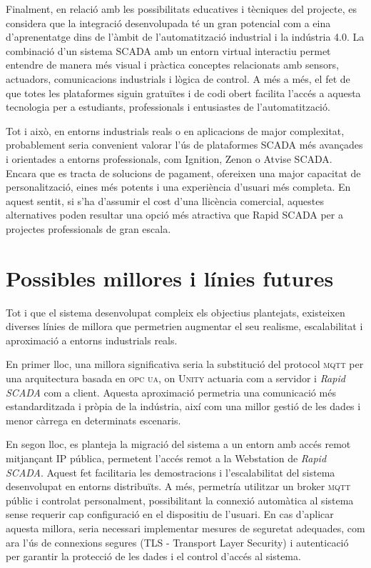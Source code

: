 \documentclass[a4paper,11pt,DIV=13,headings=normal,abstract=true,twoside=semi]{article}
\newcommand{\acro}[1]{\textsc{#1}}
\begin{document}
Finalment, en relació amb les possibilitats educatives i tècniques del projecte, es considera que la integració desenvolupada té un gran potencial com a eina d'aprenentatge dins de l'àmbit de l'automatització industrial i la indústria 4.0. La combinació d'un sistema \acro{SCADA} amb un entorn virtual interactiu permet entendre de manera més visual i pràctica conceptes relacionats amb sensors, actuadors, comunicacions industrials i lògica de control. A més a més, el fet de que totes les plataformes siguin gratuïtes i de codi obert facilita l'accés a aquesta tecnologia per a estudiants, professionals i entusiastes de l'automatització.

Tot i això, en entorns industrials reals o en aplicacions de major complexitat, probablement seria convenient valorar l'ús de plataformes \acro{SCADA} més avançades i orientades a entorns professionals, com Ignition, Zenon o Atvise SCADA. Encara que es tracta de solucions de pagament, ofereixen una major capacitat de personalització, eines més potents i una experiència d'usuari més completa. En aquest sentit, si s'ha d'assumir el cost d'una llicència comercial, aquestes alternatives poden resultar una opció més atractiva que Rapid SCADA per a projectes professionals de gran escala.

\newpage
\section{Possibles millores i línies futures}
\label{sec:future_work}
Tot i que el sistema desenvolupat compleix els objectius plantejats, existeixen diverses línies de millora que permetrien augmentar el seu realisme, escalabilitat i aproximació a entorns industrials reals.

En primer lloc, una millora significativa seria la substitució del protocol \acro{mqtt} per una arquitectura basada en \acro{opc ua}, on \acro{\acro{Unity}} actuaria com a servidor i \emph{Rapid SCADA} com a client. Aquesta aproximació permetria una comunicació més estandarditzada i pròpia de la indústria, així com una millor gestió de les dades i menor càrrega en determinats escenaris.

En segon lloc, es planteja la migració del sistema a un entorn amb accés remot mitjançant IP pública, permetent l'accés remot a la Webstation de \emph{Rapid SCADA}. Aquest fet facilitaria les demostracions i l'escalabilitat del sistema desenvolupat en entorns distribuïts.   A més, permetría utilitzar un broker \acro{mqtt} públic i controlat personalment, possibilitant la connexió automàtica al sistema sense requerir cap configuració en el dispositiu de l'usuari.  En cas d'aplicar aquesta millora, seria necessari implementar mesures de seguretat adequades, com ara l'ús de connexions segures (\acro{TLS} - Transport Layer Security) i autenticació per garantir la protecció de les dades i el control d'accés al sistema.
\end{document}
